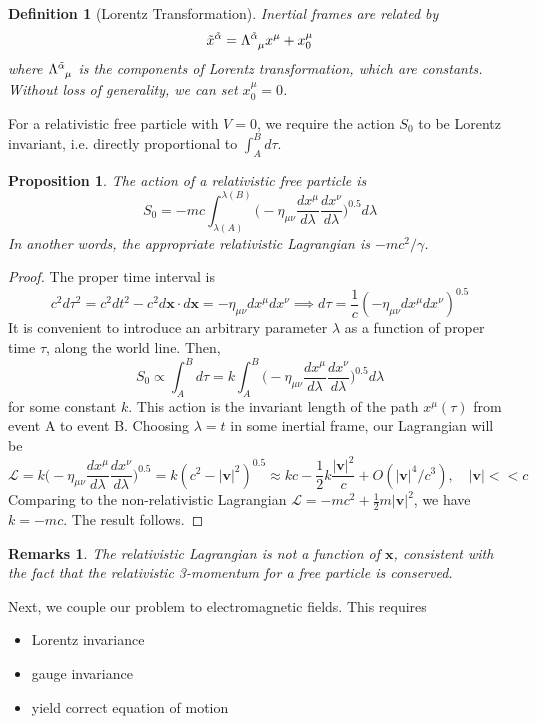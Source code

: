 \documentclass[a4paper]{article}
\newtheorem{remarks}{Remarks}[section]
\theoremstyle{new}
\newtheorem{defi}{Definition}[section]
\newtheorem{prop}{Proposition}[section]
\begin{document}
\begin{defi}[Lorentz Transformation]
Inertial frames are related by 
$$\tilde{x}^{\tilde{\alpha}}=\tensor*{\Lambda}{*_{}^{\tilde{\alpha}}_{\mu}}x^\mu+x^\mu_0$$
where $\tensor*{\Lambda}{*_{}^{\tilde{\alpha}}_{\mu}}$ is the components of Lorentz transformation, which are constants. Without loss of generality, we can set $x_0^\mu=0$.
\end{defi}
For a relativistic free particle with $V=0$, we require the action $S_0$ to be Lorentz invariant, i.e. directly proportional to $\int_A^Bd\tau$.
\begin{prop}
The action of a relativistic free particle is
$$S_0=-mc\int_{\lambda(A)}^{\lambda(B)}\bigg(-\eta_{\mu\nu}\frac{dx^\mu}{d\lambda}\frac{dx^\nu}{d\lambda}\bigg)^{0.5}d\lambda$$
In another words, the appropriate relativistic Lagrangian is $-mc^2/\gamma$.
\end{prop}
\begin{proof}
The proper time interval is
$$c^2d\tau^2=c^2dt^2-c^2d\mathbf{x}\cdot d\mathbf{x}=-\eta_{\mu\nu}dx^\mu dx^\nu\implies d\tau=\frac{1}{c}(-\eta_{\mu\nu}dx^\mu dx^\nu)^{0.5}$$
It is convenient to introduce an arbitrary parameter $\lambda$ as a function of proper time $\tau$, along the world line. Then,
$$S_0\propto \int_A^Bd\tau=k\int_A^B\bigg(-\eta_{\mu\nu}\frac{dx^\mu}{d\lambda}\frac{dx^\nu}{d\lambda}\bigg)^{0.5}d\lambda$$
for some constant $k$. This action is the invariant length of the path $x^\mu(\tau)$ from event A to event B. Choosing $\lambda=t$ in some inertial frame, our Lagrangian will be
$$\mathcal{L}=k\bigg(-\eta_{\mu\nu}\frac{dx^\mu}{d\lambda}\frac{dx^\nu}{d\lambda}\bigg)^{0.5}=k(c^2-|\mathbf{v}|^2)^{0.5}\approx kc-\frac{1}{2}k\frac{|\mathbf{v}|^2}{c}+O(|\mathbf{v}|^4/c^3),\quad|\mathbf{v}|<<c$$
Comparing to the non-relativistic Lagrangian $\mathcal{L}=-mc^2+\frac{1}{2}m|\mathbf{v}|^2$, we have $k=-mc$. The result follows.
\end{proof}
\begin{remarks}
The relativistic Lagrangian is not a function of $\mathbf{x}$, consistent with the fact that the relativistic 3-momentum for a free particle is conserved.
\end{remarks}
Next, we couple our problem to electromagnetic fields. This requires 
\begin{itemize}
    \item Lorentz invariance
    \item gauge invariance
    \item yield correct equation of motion
\end{itemize}
\end{document}
